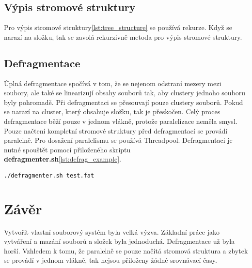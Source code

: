 \documentclass{report}
\begin{document}
\section*{Výpis stromové struktury}
Pro výpis stromové struktury\ref{lst:tree_structure} se používá rekurze. Když se narazí na složku, tak se zavolá rekurzivně metoda pro výpis stromové struktury.


\section*{Defragmentace}
Úplná defragmentace spočívá v tom, že se nejenom odstraní mezery mezi soubory, ale také se linearizují obsahy souborů tak, aby clustery jednoho souboru byly pohromadě.
Při defragmentaci se přesouvají pouze clustery souborů. Pokud se narazí na cluster, který obsahuje složku, tak je přeskočen. Celý proces defragmentace běží pouze v jednom vlákně, protože paralelizace neměla smysl. Pouze načtení kompletní stromové struktury před defragmentací se provádí paralelně. Pro dosažení paralelismu se používá Threadpool. Defragmentaci je nutné spouštět pomocí přiloženého skriptu \textbf{defragmenter.sh}\ref{lst:defrag_example}.
\begin{lstlisting}[caption=Spuštění defragmentace,label=lst:defrag_example, language={}]
./defragmenter.sh test.fat
 \end{lstlisting}

\chapter*{Závěr}
Vytvořit vlastní souborový systém byla velká výzva. Základní práce jako vytváření a mazání souborů a složek byla jednoduchá. Defragmentace už byla horší. Vzhledem k tomu, že paralelně se pouze načítá stromová struktura a zbytek se provádí v jednom vlákně, tak nejsou přiloženy žádné srovnávací časy.
\end{document}
